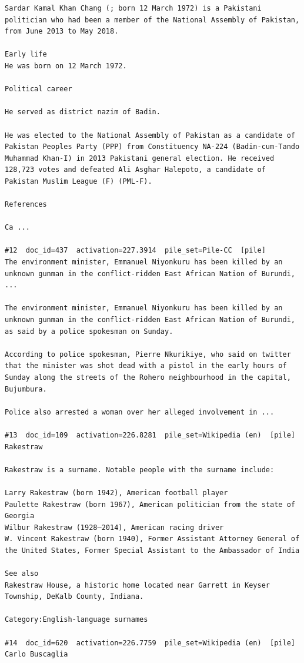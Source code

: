 \begin{verbatim}
Sardar Kamal Khan Chang (; born 12 March 1972) is a Pakistani politician who had been a member of the National Assembly of Pakistan, from June 2013 to May 2018.

Early life
He was born on 12 March 1972.

Political career

He served as district nazim of Badin.

He was elected to the National Assembly of Pakistan as a candidate of Pakistan Peoples Party (PPP) from Constituency NA-224 (Badin-cum-Tando Muhammad Khan-I) in 2013 Pakistani general election. He received 128,723 votes and defeated Ali Asghar Halepoto, a candidate of Pakistan Muslim League (F) (PML-F).

References

Ca ...

#12  doc_id=437  activation=227.3914  pile_set=Pile-CC  [pile]
The environment minister, Emmanuel Niyonkuru has been killed by an unknown gunman in the conflict-ridden East African Nation of Burundi, ...

The environment minister, Emmanuel Niyonkuru has been killed by an unknown gunman in the conflict-ridden East African Nation of Burundi, as said by a police spokesman on Sunday.

According to police spokesman, Pierre Nkurikiye, who said on twitter that the minister was shot dead with a pistol in the early hours of Sunday along the streets of the Rohero neighbourhood in the capital, Bujumbura.

Police also arrested a woman over her alleged involvement in ...

#13  doc_id=109  activation=226.8281  pile_set=Wikipedia (en)  [pile]
Rakestraw

Rakestraw is a surname. Notable people with the surname include:

Larry Rakestraw (born 1942), American football player
Paulette Rakestraw (born 1967), American politician from the state of Georgia
Wilbur Rakestraw (1928–2014), American racing driver
W. Vincent Rakestraw (born 1940), Former Assistant Attorney General of the United States, Former Special Assistant to the Ambassador of India

See also
Rakestraw House, a historic home located near Garrett in Keyser Township, DeKalb County, Indiana.

Category:English-language surnames

#14  doc_id=620  activation=226.7759  pile_set=Wikipedia (en)  [pile]
Carlo Buscaglia


\end{verbatim}
